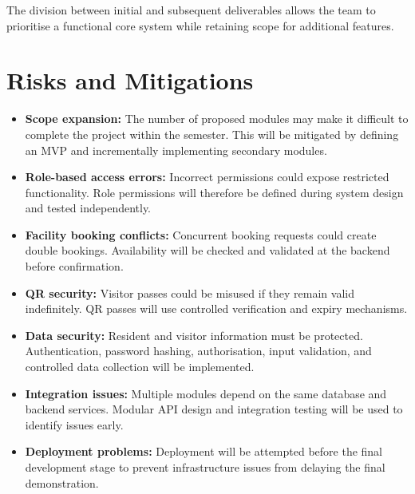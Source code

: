 \documentclass[11pt,a4paper]{article}
\begin{document}
The division between initial and subsequent deliverables allows the team to prioritise a functional core system while retaining scope for additional features.


\section{Risks and Mitigations}

\begin{itemize}

    \item \textbf{Scope expansion:} The number of proposed modules may make it difficult to complete the project within the semester. This will be mitigated by defining an MVP and incrementally implementing secondary modules.

    \item \textbf{Role-based access errors:} Incorrect permissions could expose restricted functionality. Role permissions will therefore be defined during system design and tested independently.

    \item \textbf{Facility booking conflicts:} Concurrent booking requests could create double bookings. Availability will be checked and validated at the backend before confirmation.

    \item \textbf{QR security:} Visitor passes could be misused if they remain valid indefinitely. QR passes will use controlled verification and expiry mechanisms.

    \item \textbf{Data security:} Resident and visitor information must be protected. Authentication, password hashing, authorisation, input validation, and controlled data collection will be implemented.

    \item \textbf{Integration issues:} Multiple modules depend on the same database and backend services. Modular API design and integration testing will be used to identify issues early.

    \item \textbf{Deployment problems:} Deployment will be attempted before the final development stage to prevent infrastructure issues from delaying the final demonstration.

\end{itemize}
\end{document}

